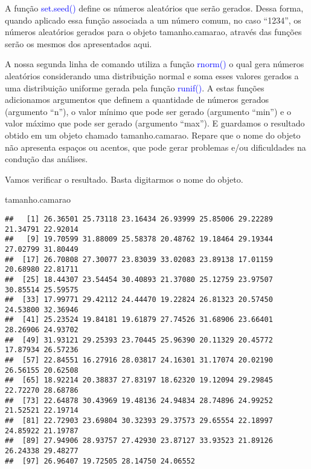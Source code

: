 \documentclass[titlepage, oneside, openany, a4paper]{book}
\newenvironment{Shaded}{\begin{snugshade}}{\end{snugshade}}
\newcommand{\NormalTok}[1]{#1}
\begin{document}
A função \textcolor{blue}{set.seed()} define os números aleatórios que serão gerados. Dessa forma, quando aplicado essa função associada a um número comum, no caso ``1234'', os números aleatórios gerados para o objeto tamanho.camarao, através das funções serão os mesmos dos apresentados aqui.

A nossa segunda linha de comando utiliza a função \textcolor{blue}{rnorm()} o qual gera números aleatórios considerando uma distribuição normal e soma esses valores gerados a uma distribuição uniforme gerada pela função \textcolor{blue}{runif()}. A estas funções adicionamos argumentos que definem a quantidade de números gerados (argumento ``n''), o valor mínimo que pode ser gerado (argumento ``min'') e o valor máximo que pode ser gerado (argumento ``max''). E guardamos o resultado obtido em um objeto chamado tamanho.camarao. Repare que o nome do objeto não apresenta espaços ou acentos, que pode gerar problemas e/ou dificuldades na condução das análises.

Vamos verificar o resultado. Basta digitarmos o nome do objeto.

\begin{Shaded}
\begin{Highlighting}[]
\NormalTok{tamanho.camarao}
\end{Highlighting}
\end{Shaded}

\begin{verbatim}
##   [1] 26.36501 25.73118 23.16434 26.93999 25.85006 29.22289 21.34791 22.92014
##   [9] 19.70599 31.88009 25.58378 20.48762 19.18464 29.19344 27.02799 31.80449
##  [17] 26.70808 27.30077 23.83039 33.02083 23.89138 17.01159 20.68980 22.81711
##  [25] 18.44307 23.54454 30.40893 21.37080 25.12759 23.97507 30.85514 25.59575
##  [33] 17.99771 29.42112 24.44470 19.22824 26.81323 20.57450 24.53800 32.36946
##  [41] 25.23524 19.84181 19.61879 27.74526 31.68906 23.66401 28.26906 24.93702
##  [49] 31.93121 29.25393 23.70445 25.96390 20.11329 20.45772 17.87934 26.57236
##  [57] 22.84551 16.27916 28.03817 24.16301 31.17074 20.02190 26.56155 20.62508
##  [65] 18.92214 20.38837 27.83197 18.62320 19.12094 29.29845 22.72270 28.68786
##  [73] 22.64878 30.43969 19.48136 24.94834 28.74896 24.99252 21.52521 22.19714
##  [81] 22.72903 23.69804 30.32393 29.37573 29.65554 22.18997 24.85922 21.19787
##  [89] 27.94906 28.93757 27.42930 23.87127 33.93523 21.89126 26.24338 29.48277
##  [97] 26.96407 19.72505 28.14750 24.06552
\end{verbatim}
\end{document}
